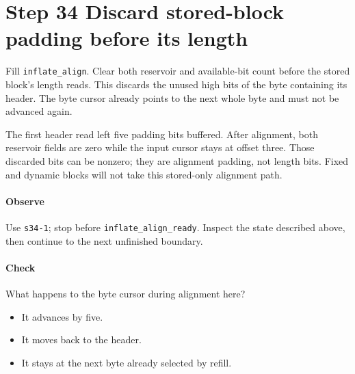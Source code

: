 \section{Step 34 Discard stored-block padding before its length}\label{png-inflate-s34}
Fill \texttt{inflate\_align}. Clear both reservoir and available-bit count before the stored block's length reads. This discards the unused high bits of the byte containing its header. The byte cursor already points to the next whole byte and must not be advanced again.

The first header read left five padding bits buffered. After alignment, both reservoir fields are zero while the input cursor stays at offset three. Those discarded bits can be nonzero; they are alignment padding, not length bits. Fixed and dynamic blocks will not take this stored-only alignment path.

\paragraph{Observe} Use \texttt{s34-1}; stop before \texttt{inflate\_align\_ready}. Inspect the state described above, then continue to the next unfinished boundary.

\paragraph{Check} What happens to the byte cursor during alignment here?
\begin{itemize}
  \item[A.] It advances by five.
  \item[B.] It moves back to the header.
  \item[C.] It stays at the next byte already selected by refill.
\end{itemize}
